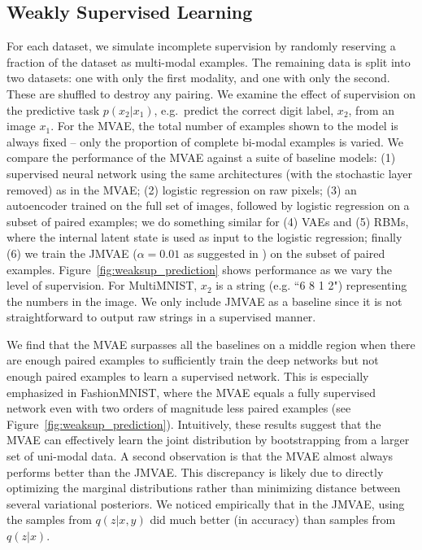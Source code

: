 \subsection{Weakly Supervised Learning}
For each dataset, we simulate incomplete supervision by randomly reserving a fraction of the dataset as multi-modal examples. The remaining data is split into two datasets: one with only the first modality, and one with only the second. These are shuffled to destroy any pairing. We examine the effect of supervision on the predictive task $p(x_2|x_1)$, e.g.~predict the correct digit label, $x_2$, from an image $x_1$. For the MVAE, the total number of examples shown to the model is always fixed -- only the proportion of complete bi-modal examples is varied. We compare the performance of the MVAE against a suite of baseline models: (1) supervised neural network using the same architectures (with the stochastic layer removed) as in the MVAE; (2) logistic regression on raw pixels; (3) an autoencoder trained on the full set of images, followed by logistic regression on a subset of paired examples; we do something similar for (4) VAEs and (5) RBMs, where the internal latent state is used as input to the logistic regression; finally (6) we train the JMVAE ($\alpha=0.01$ as suggested in \cite{suzuki2016joint}) on the subset of paired examples. Figure~\ref{fig:weaksup_prediction} shows performance as we vary the level of supervision. For MultiMNIST, $x_2$ is a string (e.g. ``6 8 1 2") representing the numbers in the image. We only include JMVAE as a baseline since it is not straightforward to output raw strings in a supervised manner.

We find that the MVAE surpasses all the baselines on a middle region when there are enough paired examples to sufficiently train the deep networks but not enough paired examples to learn a supervised network. This is especially emphasized in FashionMNIST, where the MVAE equals a fully supervised network even with two orders of magnitude less paired examples (see Figure~\ref{fig:weaksup_prediction}). Intuitively, these results suggest that the MVAE can effectively learn the joint distribution by bootstrapping from a larger set of uni-modal data. A second observation is that the MVAE almost always performs better than the JMVAE. This discrepancy is likely due to directly optimizing the marginal distributions rather than minimizing distance between several variational posteriors. We noticed empirically that in the JMVAE, using the samples from $q(z|x,y)$ did much better (in accuracy) than samples from $q(z|x)$.

